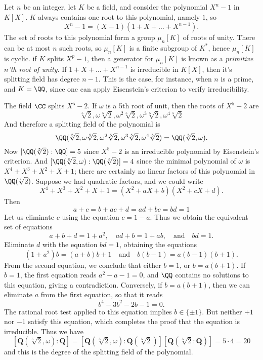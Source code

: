 \begin{example}
	Let $n$ be an integer, let $K$ be a field, and consider the polynomial $X^n - 1$ in $K[X]$. $K$ always contains one root to this polynomial, namely $1$, so
	\[ X^n - 1 = (X - 1)(1 + X + \dots + X^{n-1}). \]
	The set of roots to this polynomial form a group $\mu_n[K]$ of roots of unity. There can be at most $n$ such roots, so $\mu_n[K]$ is a finite subgroup of $K^*$, hence $\mu_n[K]$ is cyclic. if $K$ splits $X^p - 1$, then a generator for $\mu_n[K]$ is known as a \emph{primitive $n$'th root of unity}. If $1 + X + \dots + X^{n-1}$ is irreducible in $K[X]$, then it's splitting field has degree $n-1$. This is the case, for instance, when $n$ is a prime, and $K = \QQ$, since one can apply Eisenstein's criterion to verify irreducibility.
\end{example}

\begin{example}
	The field $\CC$ splits $X^5 - 2$. If $\omega$ is a 5th root of unit, then the roots of $X^5 - 2$ are
    \[ \sqrt[5]{2}, \omega \sqrt[5]{2}, \omega^2 \sqrt[5]{2}, \omega^3 \sqrt[5]{2}, \omega^4 \sqrt[5]{2} \]
    And therefore a splitting field of the polynomial is
    \[ \QQ(\sqrt[5]{2}, \omega \sqrt[5]{2}, \omega^2 \sqrt[5]{2}, \omega^3 \sqrt[5]{2}, \omega^4 \sqrt[5]{2}) = \QQ(\sqrt[5]{2}, \omega). \]
    Now $[\QQ(\sqrt[5]{2}): \QQ] = 5$ since $X^5 - 2$ is an irreducible polynomial by Eisenstein's criterion. And $[\QQ(\sqrt[5]{2}, \omega): \QQ(\sqrt[5]{2})] = 4$ since the minimal polynomial of $\omega$ is $X^4 + X^3 + X^2 + X + 1$; there are certainly no linear factors of this polynomial in $\QQ(\sqrt[5]{2})$. Suppose we had quadratic factors, and we could write
    \[ X^4 + X^3 + X^2 + X + 1 = (X^2 + aX + b)(X^2 + cX + d). \]
    Then
    \[ a + c = b + ac + d = ad + bc = bd = 1 \]
    Let us eliminate $c$ using the equation $c = 1 - a$. Thus we obtain the equivalent set of equations
    \[ a + b + d = 1 + a^2,\quad ad + b = 1 + ab,\quad\text{and}\quad bd = 1. \]
    Eliminate $d$ with the equation $bd = 1$, obtaining the equations
    \[ (1 + a^2)b = (a + b)b + 1 \quad\text{and}\quad b(b-1) = a(b-1)(b+1). \]
    From the second equation, we conclude that either $b = 1$, or $b = a(b+1)$. If $b = 1$, the first equation reads $a^2 - a - 1 = 0$, and $\QQ$ contains no solutions to this equation, giving a contradiction. Conversely, if $b = a(b+1)$, then we can eliminate $a$ from the first equation, so that it reads
    \[ b^4 - 3b^2 - 2b - 1 = 0. \]
    The rational root test applied to this equation implies $b \in \{ \pm 1 \}$. But neither $+1$ nor $-1$ satisfy this equation, which completes the proof that the equation is irreducible. Thus we have
    \[ \left[\mathbf{Q} \left(\sqrt[5]{2}, \omega \right) : \mathbf{Q} \right] = \left[\mathbf{Q} \left(\sqrt[5]{2}, \omega \right) : \mathbf{Q} \left(\sqrt[5]{2} \right) \right] \left[\mathbf{Q} \left(\sqrt[5]{2}: \mathbf{Q} \right) \right] = 5 \cdot 4 = 20 \]
    and this is the degree of the splitting field of the polynomial.
\end{example}


